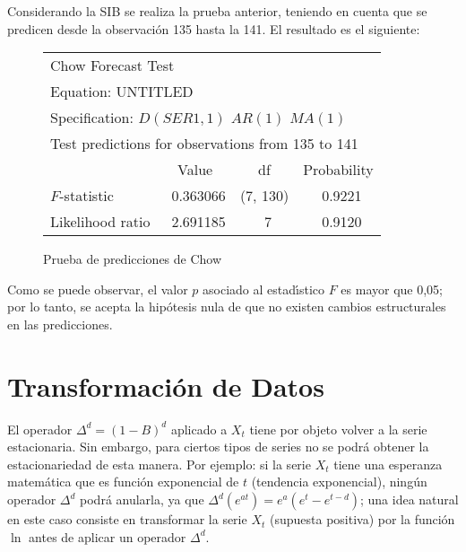 \begin{ejemplo}
Considerando la SIB se realiza la prueba anterior, 
teniendo en cuenta que se predicen desde la observaci\'{o}n 135 hasta la 
141. El resultado es el siguiente:

\begin{figure}[H]
\centering\small
\begin{tabular}{lccc}
\multicolumn{4}{l}{Chow Forecast Test}   \\
\multicolumn{4}{l}{Equation: UNTITLED} \\
\multicolumn{4}{l}{Specification: $D(SER1,1)$ $AR(1)$ $MA(1)$}   \\
\multicolumn{4}{l}{Test predictions for observations from 135 to 141} \\
\toprule
 & Value& df& Probability  \\
 \midrule
$F$-statistic& ~0.363066& (7, 130)& ~0.9221 \\
Likelihood ratio& ~2.691185& ~7& ~0.9120 \\
\bottomrule
\end{tabular}
\caption{Prueba de predicciones de Chow}
\end{figure}

Como se puede observar, el valor $p$ asociado al estad\'{\i}stico $F$ es mayor 
que 0,05; por lo tanto, se acepta la hip\'{o}tesis nula de que no existen 
cambios estructurales en las predicciones.
\end{ejemplo}




\section{Transformaci\'{o}n de Datos}

El operador $\Delta^{d}= (1-B)^{d}$ aplicado a $X_{t} $ tiene por 
objeto volver a la serie estacionaria. Sin embargo, para ciertos tipos de 
series no se podr\'{a} obtener la estacionariedad de esta manera. Por 
ejemplo: si la serie $X_{t} $ tiene una esperanza matem\'{a}tica que es 
funci\'{o}n exponencial de $t$ (tendencia exponencial), ning\'{u}n operador 
$\Delta^{d}$ podr\'{a} anularla, ya que $\Delta^{d}\left( e^{at} 
\right)=e^{a}(e^{t}-e^{t-d})$; una idea natural en este caso consiste en 
transformar la serie 
$X_{t} $ (supuesta positiva) por la funci\'{o}n $\ln$  antes de aplicar un 
operador $\Delta^{d}$.

